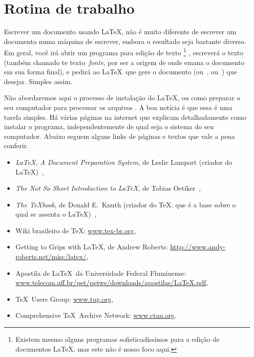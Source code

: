 \section{Rotina de trabalho}

Escrever um documento usando \LaTeX, não é muito diferente de escrever
um documento numa máquina de escrever, embora o resultado seja
bastante diverso. Em geral, você irá abrir um programa para edição
de texto%
\footnote{%
  Existem mesmo alguns programas sofisticadíssimos
  para a edição de documentos \LaTeX, mas este não é nosso foco
  aqui.}%
, escreverá o texto (também chamado te texto~\emph{fonte}, por ser a
origem de onde emana o documento em sua forma final), e pedirá ao \LaTeX\ que gere o
documento  (ou~, ou~) que
desejar. Simples assim.

Não abordaremos aqui o processo de instalação do \LaTeX, ou como
preparar o seu computador para processar os arquivos . A
boa notícia é que essa é uma tarefa simples. Há várias páginas na
internet que explicam detalhadamente como instalar o programa,
independentemente de qual seja o sistema do seu computador. Abaixo seguem
alguns links de páginas e textos que vale a pena conferir.
\begin{itemize}
\item \emph{\LaTeX, A Document Preparation System}, de Leslie Lamport
  (criador do \LaTeX)~\cite{lamport},
\item \emph{The Not So Short Introduction to \LaTeX}, de Tobias Oetiker~\cite{lshort}, 
\item \emph{The \TeX book}, de Donald E.~Knuth (criador do \TeX, que é
  a base sobre o qual se assenta o \LaTeX)~\cite{texbook},
\item Wiki brasileiro de \TeX: \url{www.tex-br.org},
\item Getting to Grips with \LaTeX, de Andrew Roberts: \url{http://www.andy-roberts.net/misc/latex/},
\item Apostila de \LaTeX\ da Universidade Federal Fluminense: \url{www.telecom.uff.br/pet/petws/downloads/apostilas/LaTeX.pdf},
\item \TeX\ Users Group: \url{www.tug.org},
\item Comprehensive \TeX\ Archive Network: \url{www.ctan.org}.
\end{itemize}
